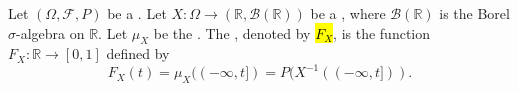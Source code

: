 \begin{definition} \label{definition:cumulative_distribution_function_of_a_real_valued_random_variable_on_a_probability_measure_space}
Let $(\Omega, \mathcal{F}, P)$ be a . Let $X: \Omega \to (\mathbb{R}, \mathcal{B}(\mathbb{R}))$ be a , where $\mathcal{B}(\mathbb{R})$ is the Borel $\sigma$-algebra on $\mathbb{R}$. Let $\mu_X$ be the . The , denoted by \hl{$F_X$}, is the function $F_X: \mathbb{R} \to [0, 1]$ defined by
$$F_X(t) = \mu_X((-\infty, t]) = P(X^{-1}((-\infty, t])).$$
\end{definition}